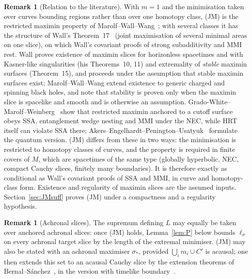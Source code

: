 \documentclass[aps,prd,onecolumn,superscriptaddress,nofootinbib,amsmath,amssymb,11pt]{revtex4-2}
\theoremstyle{definition}
\newtheorem{remark}[theorem]{Remark}
\begin{document}
\begin{remark}[Relation to the literature]\label{rem:JMlit}
With $m=1$ and the minimisation taken over curves bounding regions rather than over one homotopy class, (JM) is the
restricted maximin property of Marolf--Wall--Wang~\cite{MarolfWallWang2019}; with several classes it has the structure
of Wall's Theorem~17~\cite{Wall2014} (joint maximisation of several minimal areas on one slice), on which Wall's covariant
proofs of strong subadditivity and MMI rest. Wall proves existence of maximin slices for horizonless spacetimes and with
Kasner-like singularities (his Theorems~10, 11) and extremality of \emph{stable} maximin surfaces (Theorem~15), and
proceeds under the assumption that stable maximin surfaces exist; Marolf--Wall--Wang extend existence to generic charged
and spinning black holes, and note that stability is proven only when the maximin slice is spacelike and smooth and is
otherwise an assumption. Grado-White--Marolf--Weinberg~\cite{GradoWhiteMarolfWeinberg2021}
show that restricted maximin anchored to a cutoff surface obeys SSA, entanglement wedge nesting and MMI under the NEC,
while HRT itself can violate SSA there; Akers--Engelhardt--Penington--Usatyuk~\cite{AkersEtAl2020} formulate the quantum
version. (JM) differs from these in two ways: the minimisation is restricted to homotopy classes of curves, and the
property is required in finite covers of $M$, which are spacetimes of the same type (globally hyperbolic, NEC, compact
Cauchy slices, finitely many boundaries). It is therefore exactly as conditional as Wall's covariant proofs of SSA and
MMI, in curve and homotopy-class form. Existence and regularity of maximin slices are the assumed inputs.
Section~\ref{sec:JMsuff} proves (JM) under a compactness and a regularity hypothesis.
\end{remark}

\begin{remark}[Achronal slices]\label{rem:achronal}
The supremum defining $L$ may equally be taken over anchored achronal slices: once (JM) holds, Lemma~\ref{lem:P} below
bounds $\ell_\sigma$ on every achronal target slice by the length of the extremal minimiser. (JM) may also be stated with an
achronal maximiser $\sigma_*$, provided $\bigcup_im_i\cup C'$ is acausal; one then extends this set to an acausal Cauchy
slice by the extension theorems of Bernal--S\'anchez~\cite{BernalSanchez2006}, in the version with timelike
boundary~\cite{AkeFloresSanchez2021}.
\end{remark}
\end{document}
